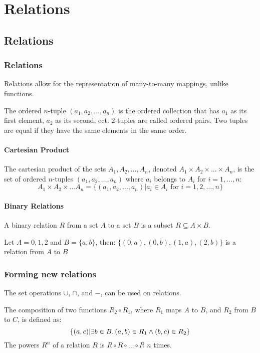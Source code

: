 \chapter{Relations}

\section{Relations}
\subsection{Relations}
Relations allow for the representation of many-to-many mappings, unlike functions.

The ordered \(n\)-tuple \((a_1, a_2, \dots, a_n)\) is the ordered collection that has \(a_1\) as its first element, \(a_2\) as its second, ect. \(2\)-tuples are called ordered pairs. Two tuples are equal if they have the same elements in the same order.

\subsubsection{Cartesian Product}
The cartesian product of the sets \(A_1, A_2, \dots, A_n\), denoted \(A_1 \times A_2 \times \dots \times A_n\), is the set of ordered \(n\)-tuples \((a_1, a_2, \dots, a_n)\) where \(a_i\) belongs to \(A_i\) for \(i = 1, \dots, n\):
\begin{equation*}
    A_1 \times A_2 \times \dots A_n = \{(a_1, a_2, \dots, a_n) | a_i \in A_i \text{ for } i = 1, 2, \dots, n\}
\end{equation*}

\subsubsection{Binary Relations}
A binary relation \(R\) from a set \(A\) to a set \(B\) is a subset \(R \subseteq A \times B\).
\begin{example}
    Let \(A = {0, 1, 2}\) and \(B = \{a, b\}\), then:
    \(\{(0, a), (0, b), (1, a), (2, b)\}\) is a relation from \(A\) to \(B\)
\end{example}

\subsection{Forming new relations}
The set operations \(\cup\), \(\cap\), and \(-\), can be used on relations.

The composition of two functions \(R_2 \circ R_1\), where \(R_1\) maps \(A\) to \(B\), and \(R_2\) from \(B\) to \(C\), is defined as:
\begin{equation*}
    \{(a, c) | \exists b \in B\ldotp (a, b) \in R_1 \land (b, c) \in R_2\}
\end{equation*}
The powers \(R^n\) of a relation \(R\) is \(R \circ R \circ \dots \circ R\) \(n\) times.

